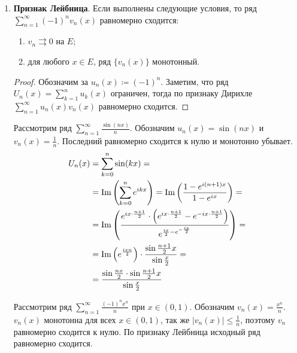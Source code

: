 \begin{prop}
\begin{enumerate}
\begin{proof}
\[\begin{aligned}
				\end{aligned}
				\]
				Так как $ v_n \rightrightarrows 0$, $ \lvert v_1(x) - v_n(x) \rvert \underset{n \to \infty}{\longrightarrow} \lvert v_1(x) \rvert $. Значит, частичная сумма ряда стремится к $ M \cdot \lvert v_1(x) \rvert $, следовательно\footnote{Например, по признаку сравнения}, второе слагаемое тоже равномерно сходится, а тогда и сумма равномерно сходится.
			\end{proof}
		\item {\bf Признак Лейбница}. Если выполнены следующие условия, то ряд $ \sum_{n=1}^{\infty} (-1)^{n}v_n(x)$ равномерно сходится:
			\begin{enumerate}[noitemsep]
			    \item $ v_n \rightrightarrows 0$ на $ E$;
				\item для любого $ x \in E$, ряд $ \{v_n(x)\}$ монотонный.
			\end{enumerate} 
			\begin{proof}
				Обозначим за $ u_n(x) \coloneqq (-1)^{n}$. Заметим, что ряд $ U_n(x) = \sum_{k=1}^{n} u_k(x)$ ограничен, тогда по признаку Дирихле $ \sum_{n=1}^{\infty} u_n(x)v_n(x)$ равномерно сходится.
			\end{proof}
			\begin{ex}
				Рассмотрим ряд $ \sum_{n=1}^{\infty} \frac{\sin(nx)}{n}$. Обозначим $ u_n(x) = \sin(nx)$ и $ v_n(x) = \frac{1}{n}$. Последний равномерно сходится к нулю и монотонно убывает.
				\[
				\begin{aligned}
					U_n(x) &= \sum_{k=0}^{n} \sin(kx) = \\
						   &= \operatorname{Im}\left(  \sum_{k=0}^{n} e^{ikx}  \right) = \operatorname{Im} \left( \frac{1-e^{i(n+1)x}}{1 - e^{ix}} \right) = \\
						   &= \operatorname{Im}\left( \frac{e^{ix\cdot \frac{n+1}{2}} \cdot \left( e^{ix\cdot \frac{n+1}{2}}- e^{-ix\cdot \frac{n+1}{2}} \right)}{e^{\frac{ix}{2} - e^{-\frac{ix}{2}}}}  \right)  = \\
						   &= \operatorname{Im} \left( e^{\frac{ixn}{2}} \right) \cdot \frac{\sin \frac{n+1}{2}x }{\sin  \frac{x}{2} } = \\
						   &= \frac{\sin \frac{nx}{2} \cdot \sin\frac{n+1}{2}x}{\sin \frac{x}{2}}
				\end{aligned}
				\]
			\end{ex}
			\begin{ex}
				Рассмотрим ряд $ \sum_{n=1}^{\infty} \frac{(-1)^{n}x^{n}}{n}$ при $ x \in (0, 1)$. Обозначим $ v_n(x) = \frac{x^{n}}{n}$. $ v_n(x)$ монотонна для всех $ x \in (0, 1)$, так же  $ \lvert v_n(x) \rvert \le \frac{1}{n}$, поэтому $ v_n$ равномерно сходится к нулю.  По признаку Лейбница исходный ряд равномерно сходится.

\end{ex}
\end{enumerate}
\end{prop}
